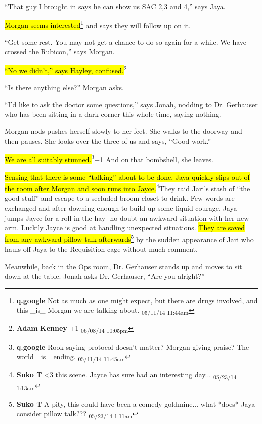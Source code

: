 ``That guy I brought in says he can show us SAC 2,3 and 4,'' says Jaya.

\hl{Morgan seems interested}\footnote{\textbf{q.google }Not as much as one might expect, but there are drugs involved, and this \_is\_ Morgan we are talking about. \textsubscript{05/11/14 11:44am}} and says they will follow up on it.

``Get some rest.  You may not get a chance to do so again for a while.  We have crossed the Rubicon,'' says Morgan.

\hl{``No we didn't,'' says Hayley, confused.}\footnote{\textbf{Adam Kenney }+1 \textsubscript{06/08/14 10:05pm}}

``Is there anything else?'' Morgan asks.

``I'd like to ask the doctor some questions,'' says Jonah, nodding to Dr. Gerhauser who has been sitting in a dark corner this whole time, saying nothing.

Morgan nods pushes herself slowly to her feet.  She walks to the doorway and then pauses.  She looks over the three of us and says, ``Good work.''

\hl{We are all suitably stunned.}\footnote{\textbf{q.google }Rook saying protocol doesn't matter?  Morgan giving praise?  The world \_is\_ ending. \textsubscript{05/11/14 11:45am}}+1  And on that bombshell, she leaves.



\hl{Sensing that there is some ``talking'' about to be done, Jaya quickly slips out of the room after Morgan and soon runs into Jayce.}\footnote{\textbf{Suko T }\textless 3 this scene.  Jayce has sure had an interesting day... \textsubscript{05/23/14 1:13am}}They raid Jari's stash of ``the good stuff'' and escape to a secluded broom closet to drink.  Few words are exchanged and after downing enough to build up some liquid courage, Jaya jumps Jayce for a roll in the hay- no doubt an awkward situation with her new arm.  Luckily Jayce is good at handling unexpected situations.  \hl{They are saved from any awkward pillow talk afterwards}\footnote{\textbf{Suko T }A pity, this could have been a comedy goldmine... what *does* Jaya consider pillow talk??? \textsubscript{05/23/14 1:11am}} by the sudden appearance of Jari who hauls off Jaya to the Requisition cage without much comment.



Meanwhile, back in the Ops room, Dr. Gerhauser stands up and moves to sit down at the table.  Jonah asks Dr. Gerhauser, ``Are you alright?''

